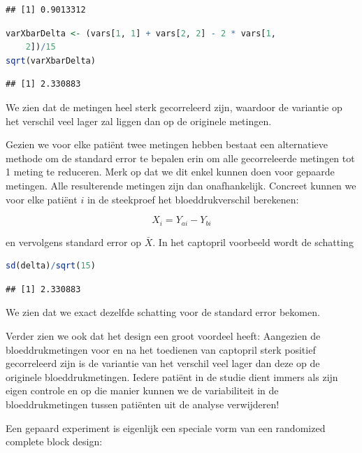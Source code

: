 \documentclass[
  12pt,dutch,coursenotes]{book}
\begin{document}
\begin{lstlisting}
## [1] 0.9013312
\end{lstlisting}

\begin{lstlisting}[language=R]
varXbarDelta <- (vars[1, 1] + vars[2, 2] - 2 * vars[1,
    2])/15
sqrt(varXbarDelta)
\end{lstlisting}

\begin{lstlisting}
## [1] 2.330883
\end{lstlisting}

We zien dat de metingen heel sterk gecorreleerd zijn, waardoor de variantie op het verschil veel lager zal liggen dan op de originele metingen.

Gezien we voor elke patiënt twee metingen hebben bestaat een alternatieve methode om de standard error te bepalen erin om alle gecorreleerde metingen tot 1 meting te reduceren. Merk op dat we dit enkel kunnen doen voor gepaarde metingen. Alle resulterende metingen zijn dan onafhankelijk.
Concreet kunnen we voor elke patiënt \(i\) in de steekproef het bloeddrukverschil berekenen:

\[X_{i}=Y_{ai}-Y_{bi}\]

en vervolgens standard error op \(\bar X\).
In het captopril voorbeeld wordt de schatting

\begin{lstlisting}[language=R]
sd(delta)/sqrt(15)
\end{lstlisting}

\begin{lstlisting}
## [1] 2.330883
\end{lstlisting}

We zien dat we exact dezelfde schatting voor de standard error bekomen.

Verder zien we ook dat het design een groot voordeel heeft:
Aangezien de bloeddrukmetingen voor en na het toedienen van captopril sterk positief gecorreleerd zijn is de variantie van het verschil veel lager dan deze op de originele bloeddrukmetingen.
Iedere patiënt in de studie dient immers als zijn eigen controle en op die manier kunnen we de variabiliteit in de bloeddrukmetingen tussen patiënten uit de analyse verwijderen!

Een gepaard experiment is eigenlijk een speciale vorm van een randomized complete block design:
\end{document}
